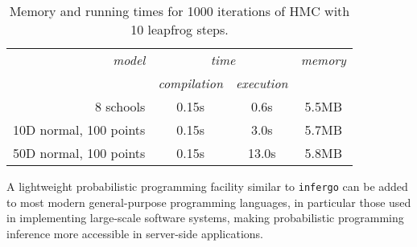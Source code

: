 \documentclass[sigplan,review]{acmart}\settopmatter{printfolios=true,printccs=false,printacmref=false}
\begin{document}
\begin{sloppypar}
{\smaller
\begin{table}[H]
	\caption{Memory and running times for 1000 iterations
	of HMC with 10 leapfrog steps.}
	\label{tab:memory-runtime}
	\begin{tabular}{r | c |  c | c}
		{\it model}  & \multicolumn{2}{c|}{\it time} & {\it memory} \\ 
		 & {\it compilation} & {\it execution} & \\\hline
		8 schools & 0.15s & 0.6s & 5.5MB \\
		10D normal, 100 points & 0.15s & 3.0s & 5.7MB \\
		50D normal, 100 points & 0.15s & 13.0s & 5.8MB 
	\end{tabular}
\end{table}}

A lightweight probabilistic programming facility similar to
\texttt{infergo} can be added to most modern general-purpose
programming languages, in particular those used in implementing
large-scale software systems, making probabilistic
programming inference more accessible in server-side
applications.
\end{sloppypar}


\end{document}

